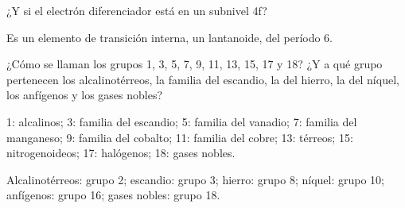 \begin{exercise}
    ¿Y si el electrón diferenciador está en un subnivel 4f?
    \begin{solu}
        Es un elemento de transición interna, un lantanoide, del período 6.
    \end{solu}
\end{exercise}

\begin{exercise}
    ¿Cómo se llaman los grupos 1, 3, 5, 7, 9, 11, 13, 15, 17 y 18? ¿Y a qué grupo pertenecen los alcalinotérreos, la familia del escandio, la del hierro, la del níquel, los anfígenos y los gases nobles?
    \begin{solu}
        1: alcalinos; 3: familia del escandio; 5: familia del vanadio; 7: familia del manganeso; 9: familia del cobalto; 11: familia del cobre; 13: térreos; 15: nitrogenoideos; 17: halógenos; 18: gases nobles.

        Alcalinotérreos: grupo 2; escandio: grupo 3; hierro: grupo 8; níquel: grupo 10; anfígenos: grupo 16; gases nobles: grupo 18.
    \end{solu}
\end{exercise}
